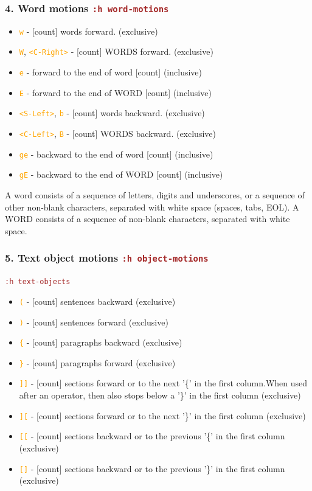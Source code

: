 \documentclass{beamer}
\newcommand{\vimcommand}[1]{\texttt{\textcolor{brown}{#1}}}
\newcommand{\vimmotion}[1]{\texttt{\textcolor{orange}{#1}}}
\newcommand{\vimhelp}[1]{\vimcommand{:h #1}}
\newcommand{\vimkey}[1]{\textless{}#1\textgreater{}}
\begin{document}
\begin{frame}
    \frametitle{4. Word motions \vimhelp{word-motions}}
    \begin{itemize}
      \item \vimmotion{w}                               - [count] words forward.  (exclusive)
      \item \vimmotion{W}, \vimmotion{\vimkey{C-Right}} - [count] WORDS forward.  (exclusive)
      \item \vimmotion{e}                               - forward to the end of word [count] (inclusive)
      \item \vimmotion{E}                               - forward to the end of WORD [count] (inclusive)
      \item \vimmotion{\vimkey{S-Left}}, \vimmotion{b}  - [count] words backward.  (exclusive)
      \item \vimmotion{\vimkey{C-Left}}, \vimmotion{B}  - [count] WORDS backward.  (exclusive)
      \item \vimmotion{ge}                              - backward to the end of word [count] (inclusive)
      \item \vimmotion{gE}                              - backward to the end of WORD [count] (inclusive)
    \end{itemize}
    {\footnotesize 
    A word consists of a sequence of letters, digits and underscores, or a
    sequence of other non-blank characters, separated with white space (spaces,
    tabs, EOL). A WORD consists of a sequence of non-blank characters, separated with white
    space.}
\end{frame}

\begin{frame}
    \frametitle{5. Text object motions \vimhelp{object-motions}}
    \vimhelp{text-objects} 
    \begin{itemize}
      \item \vimmotion{(} - [count] sentences backward (exclusive)
      \item \vimmotion{)} - [count] sentences forward (exclusive)
      \item \vimmotion{\{} - [count] paragraphs backward (exclusive)
      \item \vimmotion{\}} - [count] paragraphs forward (exclusive)
      \item \vimmotion{]]} - [count] sections forward or to the next '\{' in the first column.When used after an operator, then also stops below a '\}' in the first column (exclusive)
      \item \vimmotion{][} - [count] sections forward or to the next '\}' in the first column (exclusive)
      \item \vimmotion{[[} - [count] sections backward or to the previous '\{' in the first column (exclusive)
      \item \vimmotion{[]} - [count] sections backward or to the previous '\}' in the first column (exclusive)
    \end{itemize}
\end{frame}
\end{document}
